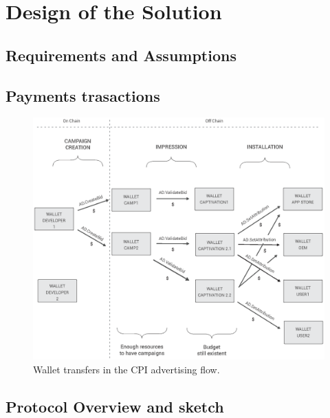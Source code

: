 \section{Design of the Solution}

\label{sec:design}


\subsection{Requirements and Assumptions }


\subsection{Payments trasactions}


\begin{figure}[!ht]
\centering
\includegraphics[width=\textwidth]{diagrams/wallet_transfers.eps}
\caption{Wallet transfers in the CPI advertising flow.}
\label{fig:wallet_cpi_flow}
\end{figure}


\subsection{Protocol Overview and sketch}


